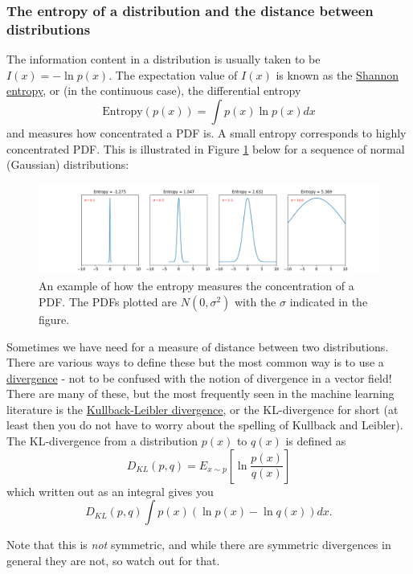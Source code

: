 \documentclass[a4paper,10pt]{article}
\begin{document}
\subsubsection{ The entropy of a distribution and the distance between distributions}

The information content in a distribution is usually taken to be $I(x) = -\ln p(x)$. The expectation value of $I(x)$ is known as the \href{https://en.wikipedia.org/wiki/Entropy_(information_theory)}{Shannon entropy}, or (in the continuous case), the differential entropy
$$\mathrm{Entropy}(p(x)) = \int p(x) \ln p(x) dx $$ and measures how concentrated a PDF is. A small entropy corresponds to highly concentrated PDF. This is illustrated in Figure \ref{fig:entr} below for a sequence of normal (Gaussian) distributions:

\begin{figure}[!h]
\includegraphics[width=\textwidth]{entropy_example.png}
\caption{An example of how the entropy measures the concentration of a PDF. The PDFs plotted are $N(0, \sigma^2)$ with the $\sigma$ indicated in the figure.}
\label{fig:entr}
\end{figure}


Sometimes we have need for a measure of distance between two distributions. There are various ways to define these but the most common way is to use a \href{https://en.wikipedia.org/wiki/Divergence_(statistics)}{divergence} - not to be confused with the notion of divergence in a vector field! There are many of these, but the most frequently seen in the machine learning literature is the \href{https://en.wikipedia.org/wiki/Kullback\%E2\%80\%93Leibler_divergence}{Kullback-Leibler divergence}, or the KL-divergence for short (at least then you do not have to worry about the spelling of Kullback and Leibler). The KL-divergence from a distribution $p(x)$ to $q(x)$ is defined as
$$D_{KL}(p, q) = E_{x\sim p} \left[\ln \frac{p(x)}{q(x)} \right]$$
which written out as an integral gives you 
$$D_{KL}(p, q)\int p(x) \left( \ln p(x) -\ln q(x) \right) dx.$$

Note that this is \textit{not} symmetric, and while there are symmetric divergences in general they are not, so watch out for that.
\end{document}

